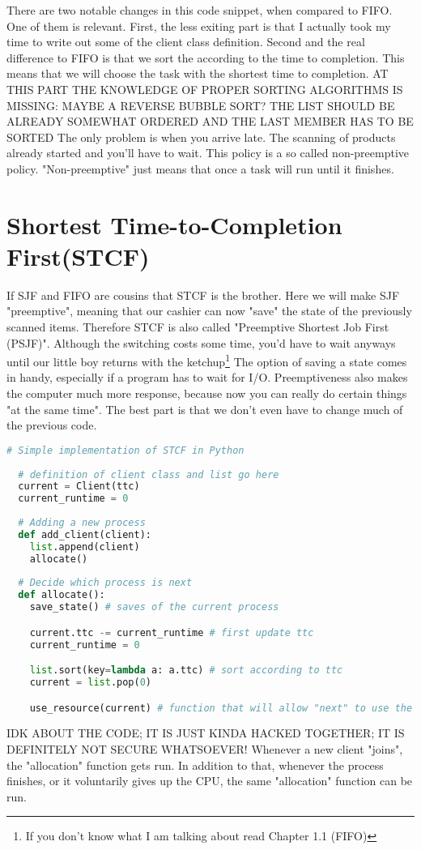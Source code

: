 \documentclass{report}
\newcounter{defi}[section]\setcounter{defi}{0}
\begin{document}
There are two notable changes in this code snippet, when compared to FIFO. One of them is relevant.
First, the less exiting part is that I actually took my time to write out some of the client class definition.
Second and the real difference to FIFO is that we sort the according to the time to completion. 
This means that we will choose the task with the shortest time to completion.
AT THIS PART THE KNOWLEDGE OF PROPER SORTING ALGORITHMS IS MISSING: MAYBE A REVERSE BUBBLE SORT? 
THE LIST SHOULD BE ALREADY SOMEWHAT ORDERED AND THE LAST MEMBER HAS TO BE SORTED
The only problem is when you arrive late. The scanning of products already started and you'll have to wait.
This policy is a so called non-preemptive policy.
"Non-preemptive" just means that once a task will run until it finishes.


\section{Shortest Time-to-Completion First(STCF)}

If SJF and FIFO are cousins that STCF is the brother.
Here we will make SJF "preemptive", meaning that our cashier can now "save" the state of the previously scanned items. 
Therefore STCF is also called "Preemptive Shortest Job First (PSJF)".
Although the switching costs some time, you'd have to wait anyways until our little boy returns with the ketchup\footnote{If you don't know what I am talking about read Chapter 1.1 (FIFO)}
The option of saving a state comes in handy, especially if a program has to wait for I/O.
Preemptiveness also makes the computer much more response, because now you can really do certain things "at the same time".
The best part is that we don't even have to change much of the previous code.
\pagebreak
\begin{lstlisting}[language=Python, style=colorEX]
  # Simple implementation of STCF in Python
  
  # definition of client class and list go here
  current = Client(ttc)
  current_runtime = 0
  
  # Adding a new process
  def add_client(client): 
    list.append(client)
    allocate()
  
  # Decide which process is next
  def allocate():
    save_state() # saves of the current process

    current.ttc -= current_runtime # first update ttc
    current_runtime = 0

    list.sort(key=lambda a: a.ttc) # sort according to ttc
    current = list.pop(0)

    use_resource(current) # function that will allow "next" to use the CPU (also tracks runtime)
\end{lstlisting}
IDK ABOUT THE CODE; IT IS JUST KINDA HACKED TOGETHER; IT IS DEFINITELY NOT SECURE WHATSOEVER! 
Whenever a new client "joins", the "allocation" function gets run.
In addition to that, whenever the process finishes, or it voluntarily gives up the CPU, the same "allocation" function can be run.
\end{document}
